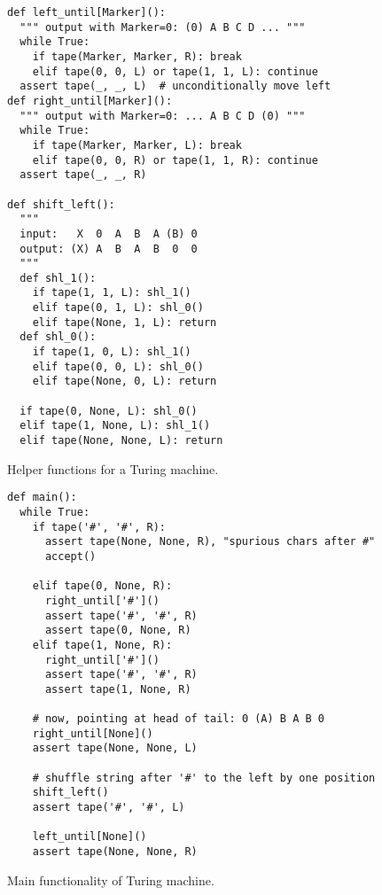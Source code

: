 \documentclass[a4paper]{article}
\begin{document}
\begin{figure}

\begin{verbatim}
def left_until[Marker]():
  """ output with Marker=0: (0) A B C D ... """
  while True:
    if tape(Marker, Marker, R): break
    elif tape(0, 0, L) or tape(1, 1, L): continue
  assert tape(_, _, L)  # unconditionally move left
def right_until[Marker]():
  """ output with Marker=0: ... A B C D (0) """
  while True:
    if tape(Marker, Marker, L): break
    elif tape(0, 0, R) or tape(1, 1, R): continue
  assert tape(_, _, R)

def shift_left():
  """
  input:   X  0  A  B  A (B) 0
  output: (X) A  B  A  B  0  0
  """
  def shl_1():
    if tape(1, 1, L): shl_1()
    elif tape(0, 1, L): shl_0()
    elif tape(None, 1, L): return
  def shl_0():
    if tape(1, 0, L): shl_1()
    elif tape(0, 0, L): shl_0()
    elif tape(None, 0, L): return

  if tape(0, None, L): shl_0()
  elif tape(1, None, L): shl_1()
  elif tape(None, None, L): return
\end{verbatim}
  \caption{Helper functions for a Turing machine.}\label{fig:tm1}
\end{figure}


\begin{figure}[h]

  \begin{verbatim}
def main():
  while True:
    if tape('#', '#', R):
      assert tape(None, None, R), "spurious chars after #"
      accept()

    elif tape(0, None, R):
      right_until['#']()
      assert tape('#', '#', R)
      assert tape(0, None, R)
    elif tape(1, None, R):
      right_until['#']()
      assert tape('#', '#', R)
      assert tape(1, None, R)

    # now, pointing at head of tail: 0 (A) B A B 0
    right_until[None]()
    assert tape(None, None, L)

    # shuffle string after '#' to the left by one position
    shift_left()
    assert tape('#', '#', L)

    left_until[None]()
    assert tape(None, None, R)
\end{verbatim}

  \caption{Main functionality of Turing machine.}\label{fig:tm2}
\end{figure}
\end{document}

